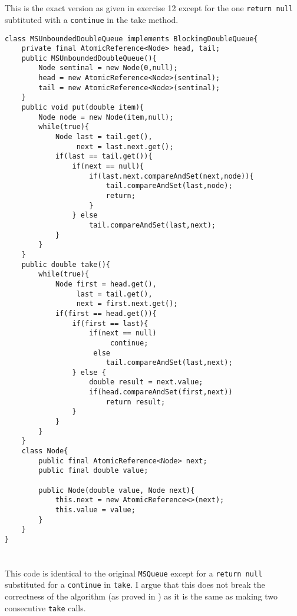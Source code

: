 \documentclass{ituhandin}
\begin{document}
\section{}
This is the exact version as given in exercise 12 except for the one \texttt{return null} subtituted with a \texttt{continue} in the take method.
\begin{lstlisting}[caption=Implementation of the \texttt{MSUnboundedDoubleQueue}]
class MSUnboundedDoubleQueue implements BlockingDoubleQueue{
    private final AtomicReference<Node> head, tail;
    public MSUnboundedDoubleQueue(){
        Node sentinal = new Node(0,null);
        head = new AtomicReference<Node>(sentinal);
        tail = new AtomicReference<Node>(sentinal);
    }
    public void put(double item){
        Node node = new Node(item,null);
        while(true){
            Node last = tail.get(), 
                 next = last.next.get();
            if(last == tail.get()){
                if(next == null){
                    if(last.next.compareAndSet(next,node)){
                        tail.compareAndSet(last,node);
                        return;
                    }
                } else 
                    tail.compareAndSet(last,next);
            }
        }
    }
    public double take(){ 
        while(true){
            Node first = head.get(),
                 last = tail.get(),
                 next = first.next.get();
            if(first == head.get()){
                if(first == last){
                    if(next == null)
                         continue;
                     else 
                        tail.compareAndSet(last,next);
                } else {
                    double result = next.value;
                    if(head.compareAndSet(first,next))
                        return result;
                }
            }
        }
    }
    class Node{
        public final AtomicReference<Node> next;
        public final double value;

        public Node(double value, Node next){
            this.next = new AtomicReference<>(next);
            this.value = value;
        }
    }
}
\end{lstlisting}

\section{}

This code is identical to the original \texttt{MSQueue} except for a \texttt{return null} substituted for a \texttt{continue} in \texttt{take}. I argue that this does not break the correctness of the algorithm (as proved in \cite{michael1996simple}) as it is the same as making two consecutive \texttt{take} calls.
\end{document}
